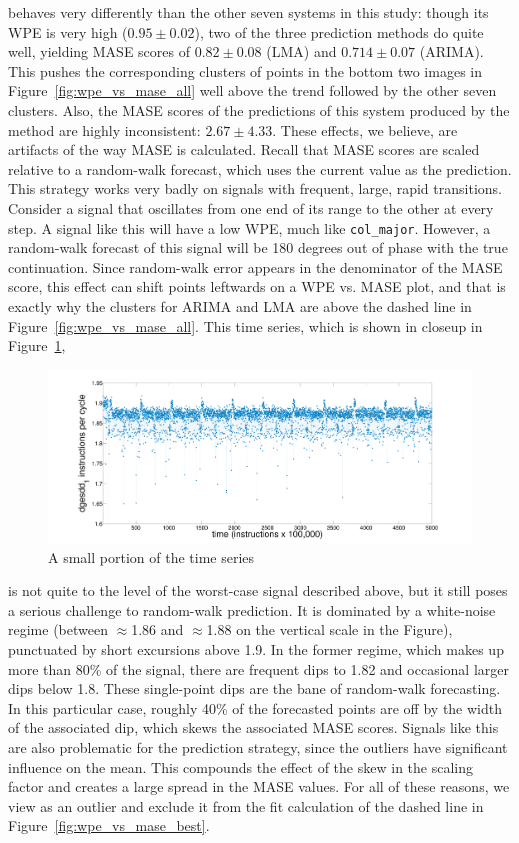 \svdone behaves very differently than the other seven systems in this
study: though its WPE is very high ($0.95 \pm 0.02$), two of the three
prediction methods do quite well, yielding MASE scores of $0.82 \pm
0.08$ (LMA) and $0.714 \pm 0.07$ (ARIMA).  This pushes the
corresponding clusters of points in the bottom two images in
Figure~\ref{fig:wpe_vs_mase_all} well above the trend followed by the
other seven clusters.  Also, the MASE scores of the predictions of
this system produced by the \naive method are highly inconsistent:
$2.67 \pm 4.33$.  These effects, we believe, are artifacts of the way
MASE is calculated.  Recall that MASE scores are scaled relative to a
random-walk forecast, which uses the current value as the prediction.
This strategy works very badly on signals with frequent, large, rapid
transitions.  Consider a signal that oscillates from one end of its
range to the other at every step.  A signal like this will have a low
WPE, much like {\tt col\_major}.  However, a random-walk forecast of
this signal will be 180 degrees out of phase with the true
continuation.  Since random-walk error appears in the denominator of
the MASE score, this effect can shift points leftwards on a WPE
vs. MASE plot, and that is exactly why the \svdone clusters for ARIMA
and LMA are above the dashed line in Figure~\ref{fig:wpe_vs_mase_all}.
This time series, which is shown in closeup in
Figure~\ref{fig:svdone-ts},
\begin{figure}[htbp]
  \centering
    \includegraphics[width=\columnwidth]{figs/svdonets2}
\caption{A small portion of the \svdone time series}\label{fig:svdone-ts}
\end{figure} 
is not quite to the level of the worst-case signal described above,
but it still poses a serious challenge to random-walk prediction.  It
is dominated by a white-noise regime (between $\approx$1.86 and
$\approx$1.88 on the vertical scale in the Figure), punctuated by
short excursions above 1.9.  In the former regime, which makes up more
than 80\% of the signal, there are frequent dips to 1.82 and
occasional larger dips below 1.8.  These single-point dips are the
bane of random-walk forecasting.  In this particular case, roughly
40\% of the forecasted points are off by the width of the associated
dip, which skews the associated MASE scores.  Signals like this are
also problematic for the \naive prediction strategy, since the
outliers have significant influence on the mean.  This compounds the
effect of the skew in the scaling factor and creates a large spread in
the \svdone MASE values.  For all of these reasons, we view \svdone as
an outlier and exclude it from the fit calculation of the dashed line
in Figure~\ref{fig:wpe_vs_mase_best}.

